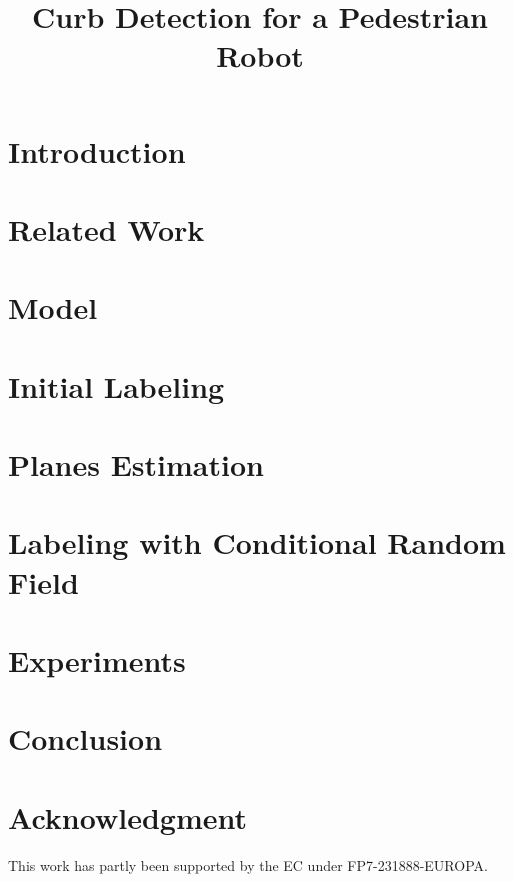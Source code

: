 \documentclass[letterpaper, 10 pt, conference]{sty/ieeeconf}
\begin{document}
\title{\LARGE \bf
Curb Detection for a Pedestrian Robot
}

\author{
}

\maketitle

\begin{abstract}

\end{abstract}

\section{Introduction}


\section{Related Work\label{sec:related}}


\section{Model\label{sec:model}}


\section{Initial Labeling\label{sec:initial}}


\section{Planes Estimation\label{sec:plane}}


\section{Labeling with Conditional Random Field\label{sec:crf}}


\section{Experiments\label{sec:exp}}


\section{Conclusion\label{sec:conc}}


\section*{Acknowledgment}
This work has partly been supported by the EC under FP7-231888-EUROPA.



\end{document}
